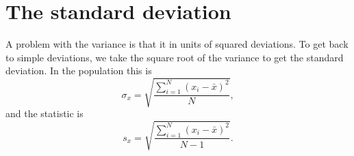 \section{The standard deviation}
A problem with the variance is that it in units of squared deviations. To get back to simple deviations, we take the square root of the variance to get the standard deviation. In the population this is
\begin{equation}
  \sigma_x=\sqrt{\frac{{\sum_{i=1}^{N}(x_i-\bar{x})^2}}{N}},
\end{equation}
and the statistic is
\begin{equation}
  s_x=\sqrt{\frac{{\sum_{i=1}^{N}(x_i-\bar{x})^2}}{N-1}}.
\end{equation}